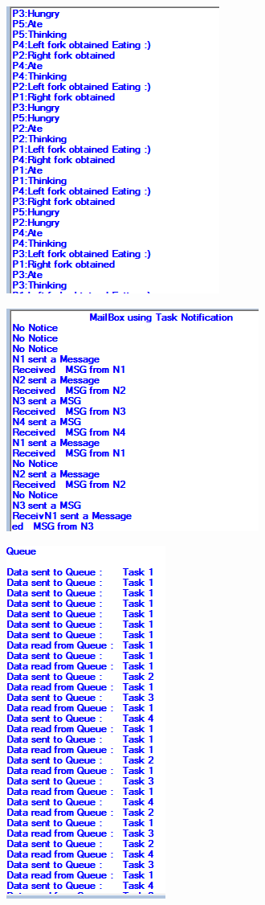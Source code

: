 \documentclass[10pt, a4paper]{beamer}
\begin{document}
\begin{frame}
\includegraphics{Dinning}
\end{frame}
\begin{frame}
	\includegraphics{mbox}
\end{frame}

\begin{frame}
	\includegraphics{queue}
\end{frame}
\end{document}
